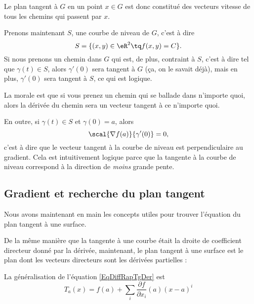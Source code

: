 Le plan tangent à $G$ en un point $x\in G$ est donc constitué des vecteurs vitesse de tous les chemins qui passent par $x$.

Prenons maintenant $S$, une courbe de niveau de $G$, c'est à dire
\begin{equation}
    S=\{ (x,y)\in\eR^2\tq f(x,y)=C \}.
\end{equation}
Si nous prenons un chemin dans $G$ qui est, de plus, contraint à $S$, c'est à dire tel que $\gamma(t)\in S$, alors $\gamma'(0)$ sera tangent à $G$ (ça, on le savait déjà), mais en plus, $\gamma'(0)$ sera tangent à $S$, ce qui est logique.

La morale est que si vous prenez un chemin qui se ballade dans n'importe quoi, alors la dérivée du chemin sera un vecteur tangent à ce n'importe quoi.

En outre, si $\gamma(t)\in S$ et $\gamma(0)=a$, alors
\begin{equation}
    \scal{\nabla f(a)}{\gamma'(0)}=0,
\end{equation}
c'est à dire que le vecteur tangent à la courbe de niveau est perpendiculaire au gradient. Cela est intuitivement logique parce que la tangente à la courbe de niveau correspond à la direction de \emph{moins} grande pente.

                    \subsection{Gradient et recherche du plan tangent}

Nous avons maintenant en main les concepts utiles pour trouver l'équation du plan tangent à une surface.

De la même manière que la tangente à une courbe était la droite de coefficient directeur donné par la dérivée, maintenant, le plan tangent à une surface est le plan dont les vecteurs directeurs sont les dérivées partielles :

La généralisation de l'équation \eqref{EqDiffRapTgDer} est 
\begin{equation}        \label{EqDefPlanTag}
    T_a(x)=f(a)+\sum_i\frac{ \partial f }{ \partial x_i }(a)(x-a)^i
\end{equation}

